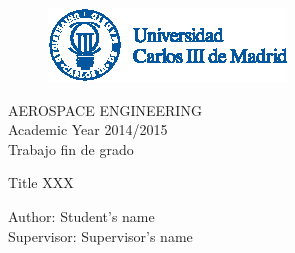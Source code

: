 \begin{titlepage}



\begin{center}



\begin{figure}[t!]
\begin{center}
\includegraphics[width=0.75\columnwidth]{../eps/logoUC3M.eps} 
\end{center}
\end{figure}
\vspace{5cm}
{\large AEROSPACE ENGINEERING}\\
\vspace{1cm}
Academic Year 2014/2015\\
Trabajo fin de grado
\vspace{3cm}

{\Huge Title XXX}\\

\vspace{8cm}




Author: Student's name\\
Supervisor: Supervisor's name


\end{center}



\end{titlepage}
